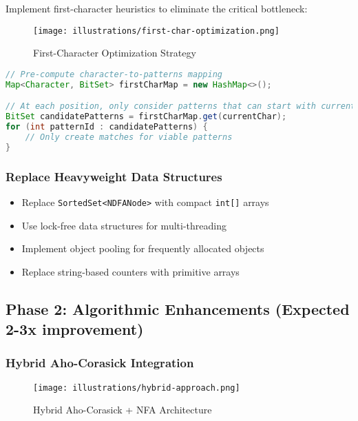 \documentclass[11pt,a4paper]{article}
\begin{document}
Implement first-character heuristics to eliminate the critical bottleneck:

\begin{figure}[htbp]
\centering
\texttt{[image: illustrations/first-char-optimization.png]}
\caption{First-Character Optimization Strategy}
\label{fig:first-char}
\end{figure}

\begin{lstlisting}[language=Java,caption=Proposed first-character optimization]
// Pre-compute character-to-patterns mapping
Map<Character, BitSet> firstCharMap = new HashMap<>();

// At each position, only consider patterns that can start with current char
BitSet candidatePatterns = firstCharMap.get(currentChar);
for (int patternId : candidatePatterns) {
    // Only create matches for viable patterns
}
\end{lstlisting}

\subsubsection{Replace Heavyweight Data Structures}

\begin{itemize}
\item Replace \texttt{SortedSet<NDFANode>} with compact \texttt{int[]} arrays
\item Use lock-free data structures for multi-threading
\item Implement object pooling for frequently allocated objects
\item Replace string-based counters with primitive arrays
\end{itemize}

\subsection{Phase 2: Algorithmic Enhancements (Expected 2-3x improvement)}

\subsubsection{Hybrid Aho-Corasick Integration}

\begin{figure}[htbp]
\centering
\texttt{[image: illustrations/hybrid-approach.png]}
\caption{Hybrid Aho-Corasick + NFA Architecture}
\label{fig:hybrid}
\end{figure}
\end{document}
